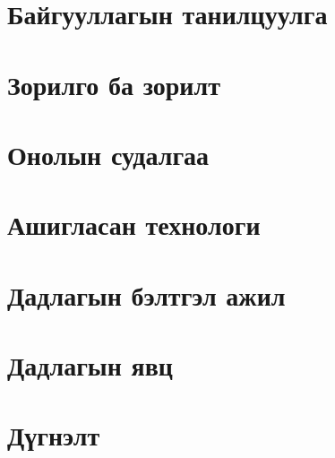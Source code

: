 
\chapter{Байгууллагын танилцуулга}


\chapter{Зорилго ба зорилт}


\chapter{Онолын судалгаа}


\chapter{Ашигласан технологи}


\chapter{Дадлагын бэлтгэл ажил}


\chapter{Дадлагын явц}


\chapter{Дүгнэлт}
